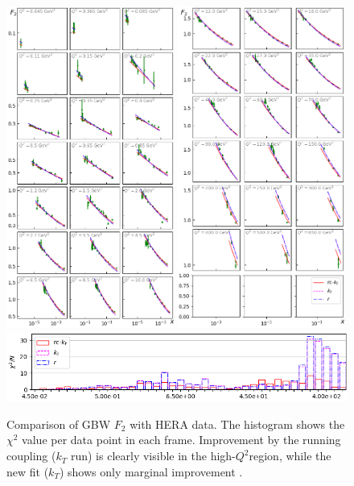 \documentclass[11pt]{article}
\numberwithin{equation}{section}
\numberwithin{table}{section}
\numberwithin{figure}{section}
\begin{document}
\begin{figure}[p]
\includegraphics[width=0.49\textwidth]{./plots/Figure_1.png}
\includegraphics[width=0.49\textwidth]{./plots/Figure_2.png}
\includegraphics[width=\textwidth]{./plots/Figure_3.png}
\caption{Comparison of GBW $F_2$ with HERA data. The histogram shows the $\chi^2$ value per data point in each frame.
 Improvement by the running coupling ($k_T$ run) is clearly visible in the high-$Q^2$region, while the new fit ($k_T$) shows only marginal improvement .  }
\label{fig:GBW-Grid}
\end{figure}
\end{document}
